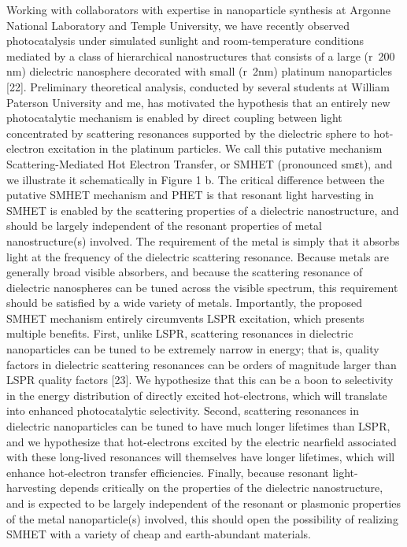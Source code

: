 \documentclass[journal=jacsat,manuscript=article]{achemso}
\begin{document}
Working with collaborators with expertise in nanoparticle synthesis at Argonne National Laboratory and Temple University, we have recently observed photocatalysis under simulated sunlight and room-temperature conditions mediated by a class of hierarchical nanostructures that consists of a large (r~200 nm) dielectric nanosphere decorated with small (r~2nm) platinum nanoparticles [22].  Preliminary theoretical analysis, conducted by several students at William Paterson University and me, has motivated the hypothesis that an entirely new photocatalytic mechanism is enabled by direct coupling between light concentrated by scattering resonances supported by the dielectric sphere to hot-electron excitation in the platinum particles.  We call this putative mechanism Scattering-Mediated Hot Electron Transfer, or SMHET (pronounced smεt), and we illustrate it schematically in Figure 1 b.  The critical difference between the putative SMHET mechanism and PHET is that resonant light harvesting in SMHET is enabled by the scattering properties of a dielectric nanostructure, and should be largely independent of the resonant properties of metal nanostructure(s) involved.  The requirement of the metal is simply that it absorbs light at the frequency of the dielectric scattering resonance.  Because metals are generally broad visible absorbers, and because the scattering resonance of dielectric nanospheres can be tuned across the visible spectrum, this requirement should be satisfied by a wide variety of metals. 
Importantly, the proposed SMHET mechanism entirely circumvents LSPR excitation, which presents multiple benefits.  First, unlike LSPR, scattering resonances in dielectric nanoparticles can be tuned to be extremely narrow in energy; that is, quality factors in dielectric scattering resonances can be orders of magnitude larger than LSPR quality factors [23].  We hypothesize that this can be a boon to selectivity in the energy distribution of directly excited hot-electrons, which will translate into enhanced photocatalytic selectivity.  Second, scattering resonances in dielectric nanoparticles can be tuned to have much longer lifetimes than LSPR, and we hypothesize that hot-electrons excited by the electric nearfield associated with these long-lived resonances will themselves have longer lifetimes, which will enhance hot-electron transfer efficiencies.  Finally, because resonant light-harvesting depends critically on the properties of the dielectric nanostructure, and is expected to be largely independent of the resonant or plasmonic properties of the metal nanoparticle(s) involved, this should open the possibility of realizing SMHET with a variety of cheap and earth-abundant materials.   
\end{document}
